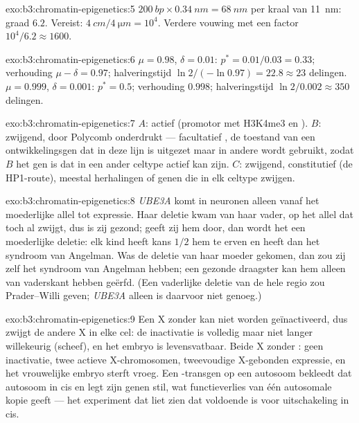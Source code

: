 \begin{solution}{exo:b3:chromatin-epigenetics:5}
$\qty{200}{bp}\times \qty{0.34}{nm} = \qty{68}{nm}$ per kraal van
\qty{11}{nm}: graad $6.2$. Vereist: $\qty{4}{cm}/\qty{4}{\micro m} =
10^{4}$. Verdere vouwing met een factor $10^{4}/6.2 \approx 1600$.
\end{solution}

\begin{solution}{exo:b3:chromatin-epigenetics:6}
$\mu = 0.98$, $\delta = 0.01$: $p^{*} = 0.01/0.03 = 0.33$; verhouding $\mu -
\delta = 0.97$; halveringstijd $\ln 2/(-\ln 0.97) = 22.8 \approx 23$
delingen. $\mu = 0.999$, $\delta = 0.001$: $p^{*} = 0.5$; verhouding
$0.998$; halveringstijd $\ln 2 / 0.002 \approx 350$ delingen.
\end{solution}

\begin{solution}{exo:b3:chromatin-epigenetics:7}
$A$: actief (promotor met H3K4me3 en ). $B$: zwijgend, door
Polycomb onderdrukt --- facultatief , de toestand van
een ontwikkelingsgen dat in deze lijn is uitgezet maar in andere wordt
gebruikt, zodat $B$ het gen is dat in een ander celtype actief kan
zijn. $C$: zwijgend, constitutief  (de HP1-route),
meestal herhalingen of genen die in elk celtype zwijgen.
\end{solution}

\begin{solution}{exo:b3:chromatin-epigenetics:8}
\emph{UBE3A} komt in neuronen alleen vanaf het moederlijke allel tot
expressie. Haar deletie kwam van haar vader, op het allel dat toch al
zwijgt, dus is zij gezond; geeft zij hem door, dan wordt het een
moederlijke deletie: elk kind heeft kans $1/2$ hem te erven en heeft
dan het syndroom van Angelman. Was de deletie van haar moeder gekomen,
dan zou zij zelf het syndroom van Angelman hebben; een gezonde
draagster kan hem alleen van vaderskant hebben geërfd. (Een vaderlijke
deletie van de hele regio zou Prader--Willi geven; \emph{UBE3A} alleen
is daarvoor niet genoeg.)
\end{solution}

\begin{solution}{exo:b3:chromatin-epigenetics:9}
Een X zonder \emph{} kan niet worden geïnactiveerd, dus zwijgt de
andere X in elke cel: de inactivatie is volledig maar niet langer
willekeurig (scheef), en het embryo is levensvatbaar. Beide X zonder
\emph{}: geen inactivatie, twee actieve X-chromosomen, tweevoudige
X-gebonden expressie, en het vrouwelijke embryo sterft vroeg. Een
\emph{}-transgen op een autosoom bekleedt dat autosoom in cis en
legt zijn genen stil, wat functieverlies van één autosomale kopie
geeft --- het experiment dat liet zien dat \emph{} voldoende is
voor uitschakeling in cis.
\end{solution}

